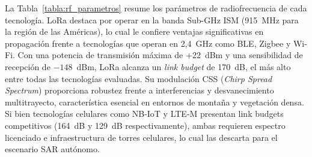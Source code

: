 La Tabla~\ref{tabla:rf_parametros} resume los parámetros de radiofrecuencia de cada tecnología. LoRa destaca por operar en la banda Sub-GHz ISM (915~MHz para la región de las Américas), lo cual le confiere ventajas significativas en propagación frente a tecnologías que operan en 2,4~GHz como BLE, Zigbee y Wi-Fi. Con una potencia de transmisión máxima de +22~dBm y una sensibilidad de recepción de $-148$~dBm, LoRa alcanza un \textit{link budget} de 170~dB, el más alto entre todas las tecnologías evaluadas. Su modulación CSS (\textit{Chirp Spread Spectrum}) proporciona robustez frente a interferencias y desvanecimiento multitrayecto, característica esencial en entornos de montaña y vegetación densa. Si bien tecnologías celulares como NB-IoT y LTE-M presentan link budgets competitivos (164~dB y 129~dB respectivamente), ambas requieren espectro licenciado e infraestructura de torres celulares, lo cual las descarta para el escenario SAR autónomo.

\begin{table}[H]
\begin{center}
\caption{Comparación de parámetros de radiofrecuencia entre tecnologías inalámbricas candidatas para SAR.}
\label{tabla:rf_parametros}
\end{center}
\end{table}

